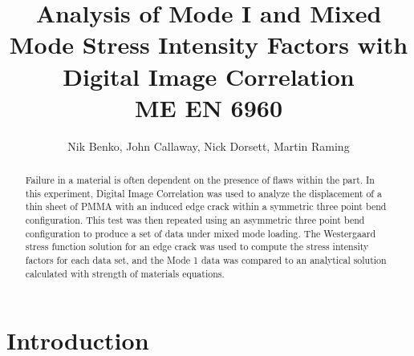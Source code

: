 \documentclass[12pt]{article}
\begin{document}
\title{ Analysis of Mode I and Mixed Mode Stress Intensity Factors with Digital Image Correlation \\ \normalsize{ME EN 6960}}
\author{Nik Benko, John Callaway, Nick Dorsett, Martin Raming}
\maketitle


\begin{abstract} 
	Failure in a material is often dependent on the presence of flaws within the part. In this experiment, Digital Image Correlation was used to analyze the displacement of a thin sheet of PMMA with an induced edge crack within a symmetric three point bend configuration. This test was then repeated using an asymmetric three point bend configuration to produce a set of data under mixed mode loading. The Westergaard stress function solution for an edge crack was used to compute the stress intensity factors for each data set, and the Mode 1 data was compared to an analytical solution calculated with strength of materials equations. 
\end{abstract}

\section{Introduction} %
\end{document}
